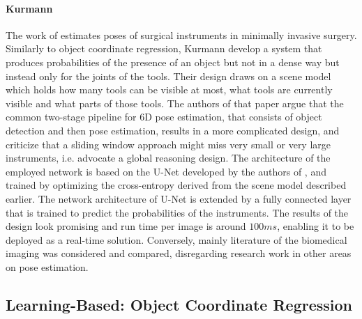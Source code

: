\paragraph{Kurmann \etal}

The work of \cite{kurmann} estimates poses of surgical instruments in minimally invasive surgery. Similarly to object coordinate regression, Kurmann \etal develop a system that produces probabilities of the presence of an object but not in a dense way but instead only for the joints of the tools. Their design draws on a scene model which holds how many tools can be visible at most, what tools are currently visible and what parts of those tools.
\nnewline 
The authors of that paper argue that the common two-stage pipeline for 6D pose estimation, that consists of object detection and then pose estimation, results in a more complicated design, and criticize that a sliding window approach might miss very small or very large instruments, i.e. advocate a global reasoning design.
\nnewline
The architecture of the employed network is based on the U-Net developed by the authors of \cite{oronneberger}, and trained by optimizing the cross-entropy derived from the scene model described earlier. The network architecture of U-Net is extended by a fully connected layer that is trained to predict the probabilities of the instruments.
\nnewline
The results of the design look promising and run time per image is around $100 ms$, enabling it to be deployed as a real-time solution. Conversely, mainly literature of the biomedical imaging was considered and compared, disregarding research work in other areas on pose estimation.

\subsection{Learning-Based: Object Coordinate Regression}

